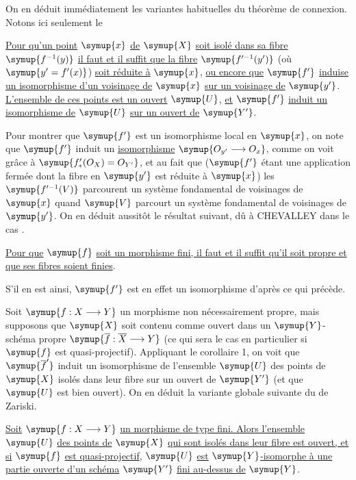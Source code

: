 On en déduit immédiatement les variantes habituelles du théorème de connexion.
Notons ici seulement le

 \uline{Pour qu'un point} $\symup{x}$ \uline{de} $\symup{X}$ \uline{soit isolé dans sa fibre}
$\symup{f^{-1}(y)}$ \uline{il faut et il suffit que la fibre} $\symup{f'^{-1}(y')}$ (où
$\symup{y'=f'(x)}$) \uline{soit réduite à} $\symup{x}$, \uline{ou encore que} $\symup{f'}$ \uline{induise un isomorphisme
d'un voisinage de} $\symup{x}$ \uline{sur un voisinage de} $\symup{y'}$. \uline{L'ensemble de ces points est
un ouvert} $\symup{U}$, \uline{et} $\symup{f'}$ \uline{induit un isomorphisme de} $\symup{U}$ \uline{sur un ouvert de} $\symup{Y'}$.

Pour montrer que $\symup{f'}$ est un isomorphisme local en $\symup{x}$, on note que $\symup{f'}$ induit
un \uline{isomorphisme} $\symup{O_{y'}\longrightarrow O_x}$, comme on voit grâce à
$\symup{f'_*(O_X)=O_{Y'}}$, et au fait que ($\symup{f'}$ étant une application fermée
dont la fibre en $\symup{y'}$ est réduite à $\symup{x}$) les $\symup{f'^{-1}(V)}$ parcourent un
système fondamental de voisinages de $\symup{x}$ quand $\symup{V}$ parcourt un système
fondamental de voisinages de $\symup{y'}$. On en déduit aussitôt le résultat suivant,
dû à CHEVALLEY dans le cas .

 \uline{Pour que} $\symup{f}$ \uline{soit un morphisme fini, il faut et il
suffit qu'il soit propre et que ses fibres soient finies}.

S'il en est ainsi, $\symup{f'}$ est en effet un isomorphisme d'après ce qui précède.

Soit $\symup{f:X\longrightarrow Y}$ un morphisme non nécessairement propre, mais
supposons que $\symup{X}$ soit contenu comme ouvert dans un $\symup{Y}$-schéma propre
$\symup{\overline f:\overline X\longrightarrow Y}$ (ce qui sera le cas en
particulier si $\symup{f}$ est quasi-projectif). Appliquant le corollaire 1, on voit que
$\symup{\overline f'}$ induit un isomorphisme de l'ensemble $\symup{U}$ des points de $\symup{X}$
isolés dans leur fibre sur un ouvert de $\symup{Y'}$ (et que $\symup{U}$ est bien ouvert). On
en déduit la variante globale suivante du  de Zariski.

 \uline{Soit}
$\symup{f:X\longrightarrow Y}$ \uline{un morphisme de type fini. Alors l'ensemble} $\symup{U}$ \uline{des
points de} $\symup{X}$ \uline{qui sont isolés dans leur fibre est ouvert, et si} $\symup{f}$ \uline{est
quasi-projectif}, $\symup{U}$ \uline{est}
$\symup{Y}$\uline{-isomorphe à une partie ouverte d'un schéma} $\symup{Y'}$ \uline{fini au-dessus de} $\symup{Y}$.

